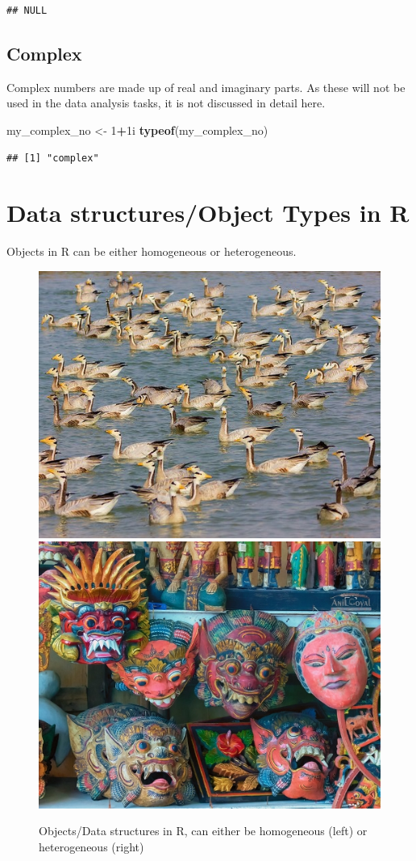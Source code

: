 \documentclass[
]{book}
\newenvironment{Shaded}{\begin{snugshade}}{\end{snugshade}}
\newcommand{\DecValTok}[1]{\textcolor[rgb]{0.00,0.00,0.81}{#1}}
\newcommand{\FunctionTok}[1]{\textcolor[rgb]{0.13,0.29,0.53}{\textbf{#1}}}
\newcommand{\NormalTok}[1]{#1}
\newcommand{\OtherTok}[1]{\textcolor[rgb]{0.56,0.35,0.01}{#1}}
\newcommand{\SpecialCharTok}[1]{\textcolor[rgb]{0.81,0.36,0.00}{\textbf{#1}}}
\begin{document}
\begin{verbatim}
## NULL
\end{verbatim}

\hypertarget{complex}{%
\subsection{Complex}\label{complex}}

Complex numbers are made up of real and imaginary parts. As these will not be used in the data analysis tasks, it is not discussed in detail here.

\begin{Shaded}
\begin{Highlighting}[]
\NormalTok{my\_complex\_no }\OtherTok{\textless{}{-}} \DecValTok{1}\SpecialCharTok{+}\NormalTok{1i}
\FunctionTok{typeof}\NormalTok{(my\_complex\_no)}
\end{Highlighting}
\end{Shaded}

\begin{verbatim}
## [1] "complex"
\end{verbatim}

\hypertarget{data-structuresobject-types-in-r}{%
\section{Data structures/Object Types in R}\label{data-structuresobject-types-in-r}}

Objects in R can be either homogeneous or heterogeneous.

\begin{figure}

{\centering \includegraphics[width=0.49\linewidth,height=0.49\textheight]{images/homgeneous} \includegraphics[width=0.49\linewidth,height=0.49\textheight]{images/hetero} 

}

\caption{Objects/Data structures in R, can either be homogeneous (left) or heterogeneous (right)}\label{fig:datastr}
\end{figure}
\end{document}
